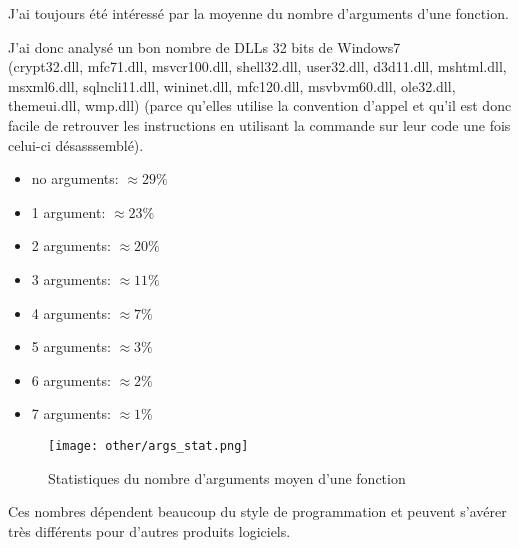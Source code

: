 ﻿
\label{args_stat}

J'ai toujours été intéressé par la moyenne du nombre d'arguments d'une fonction.

J'ai donc analysé un bon nombre de DLLs 32 bits de Windows7\\
(crypt32.dll, mfc71.dll, msvcr100.dll, shell32.dll, 
user32.dll, d3d11.dll, mshtml.dll, msxml6.dll, sqlncli11.dll, wininet.dll, mfc120.dll, msvbvm60.dll, 
ole32.dll, themeui.dll, wmp.dll) 
(parce qu'elles utilise la convention d'appel  et qu'il est donc facile de retrouver 
les instructions  en utilisant la commande  sur leur code une fois celui-ci 
désasssemblé).

\begin{itemize}
\item no arguments: $\approx 29\%$
\item 1 argument: $\approx 23\%$
\item 2 arguments: $\approx 20\%$
\item 3 arguments: $\approx 11\%$
\item 4 arguments: $\approx 7\%$
\item 5 arguments: $\approx 3\%$
\item 6 arguments: $\approx 2\%$
\item 7 arguments: $\approx 1\%$
\end{itemize}

\begin{figure}[H]
\centering
\texttt{[image: other/args\_stat.png]}
\caption{Statistiques du nombre d'arguments moyen d'une fonction}
\end{figure}

Ces nombres dépendent beaucoup du style de programmation et peuvent s'avérer très différents pour 
d'autres produits logiciels.

